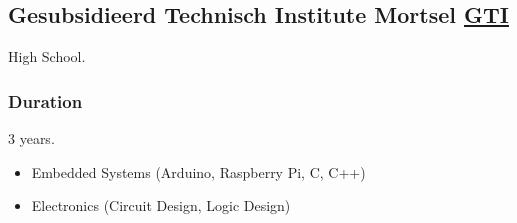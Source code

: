    \subsection{Gesubsidieerd Technisch Institute Mortsel \href{https://gtimortsel.be/}{GTI}}
    \hspace*{\fill}{\textcolor{mygrey}{2016}}
    
    High School.
    \subsubsection{Duration}
      3 years.
      \begin{itemize}
        \item Embedded Systems (Arduino, Raspberry Pi, C, C++)
        \item Electronics (Circuit Design, Logic Design)
      \end{itemize}
